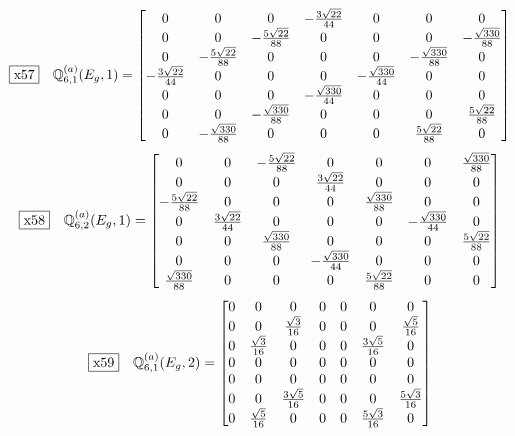 \documentclass[fleqn,10pt,landscape]{jsarticle}
\begin{document}
\begin{dmath*}
\fbox{x57}\quad \mathbb{Q}_{6,1}^{(a)}(E_{g},1)=\begin{bmatrix} 0 & 0 & 0 & - \frac{3 \sqrt{22}}{44} & 0 & 0 & 0 \\ 0 & 0 & - \frac{5 \sqrt{22}}{88} & 0 & 0 & 0 & - \frac{\sqrt{330}}{88} \\ 0 & - \frac{5 \sqrt{22}}{88} & 0 & 0 & 0 & - \frac{\sqrt{330}}{88} & 0 \\ - \frac{3 \sqrt{22}}{44} & 0 & 0 & 0 & - \frac{\sqrt{330}}{44} & 0 & 0 \\ 0 & 0 & 0 & - \frac{\sqrt{330}}{44} & 0 & 0 & 0 \\ 0 & 0 & - \frac{\sqrt{330}}{88} & 0 & 0 & 0 & \frac{5 \sqrt{22}}{88} \\ 0 & - \frac{\sqrt{330}}{88} & 0 & 0 & 0 & \frac{5 \sqrt{22}}{88} & 0 \end{bmatrix}
\end{dmath*}
\begin{dmath*}
\fbox{x58}\quad \mathbb{Q}_{6,2}^{(a)}(E_{g},1)=\begin{bmatrix} 0 & 0 & - \frac{5 \sqrt{22}}{88} & 0 & 0 & 0 & \frac{\sqrt{330}}{88} \\ 0 & 0 & 0 & \frac{3 \sqrt{22}}{44} & 0 & 0 & 0 \\ - \frac{5 \sqrt{22}}{88} & 0 & 0 & 0 & \frac{\sqrt{330}}{88} & 0 & 0 \\ 0 & \frac{3 \sqrt{22}}{44} & 0 & 0 & 0 & - \frac{\sqrt{330}}{44} & 0 \\ 0 & 0 & \frac{\sqrt{330}}{88} & 0 & 0 & 0 & \frac{5 \sqrt{22}}{88} \\ 0 & 0 & 0 & - \frac{\sqrt{330}}{44} & 0 & 0 & 0 \\ \frac{\sqrt{330}}{88} & 0 & 0 & 0 & \frac{5 \sqrt{22}}{88} & 0 & 0 \end{bmatrix}
\end{dmath*}
\begin{dmath*}
\fbox{x59}\quad \mathbb{Q}_{6,1}^{(a)}(E_{g},2)=\begin{bmatrix} 0 & 0 & 0 & 0 & 0 & 0 & 0 \\ 0 & 0 & \frac{\sqrt{3}}{16} & 0 & 0 & 0 & \frac{\sqrt{5}}{16} \\ 0 & \frac{\sqrt{3}}{16} & 0 & 0 & 0 & \frac{3 \sqrt{5}}{16} & 0 \\ 0 & 0 & 0 & 0 & 0 & 0 & 0 \\ 0 & 0 & 0 & 0 & 0 & 0 & 0 \\ 0 & 0 & \frac{3 \sqrt{5}}{16} & 0 & 0 & 0 & \frac{5 \sqrt{3}}{16} \\ 0 & \frac{\sqrt{5}}{16} & 0 & 0 & 0 & \frac{5 \sqrt{3}}{16} & 0 \end{bmatrix}
\end{dmath*}
\end{document}
